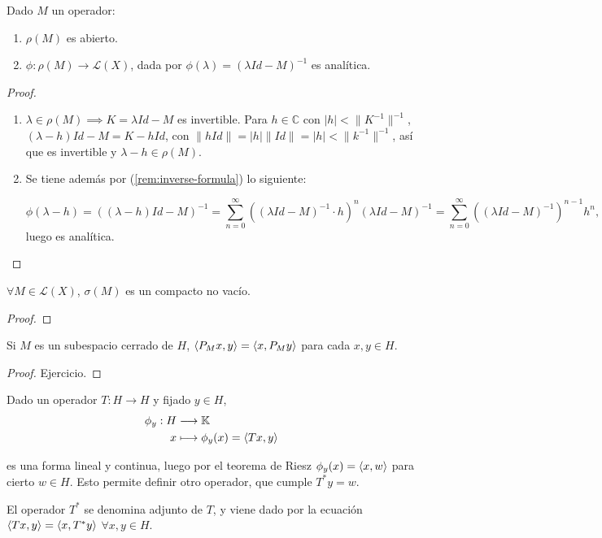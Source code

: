 \begin{theorem}
  Dado $M$ un operador:
  \begin{enumerate}
    \item $\rho(M)$ es abierto.
    \item $\phi:\rho(M)\to  \mathcal{L}(X)$, dada por $\phi(\lambda)=(\lambda
      Id-M)^{-1}$ es analítica.
  \end{enumerate}
\end{theorem}

\begin{proof}
  \begin{enumerate}
    \item $\lambda\in \rho(M)\implies K=\lambda Id-M$ es invertible. Para $h\in
      \mathbb{C}$ con $|h|<\|K^{-1}\|^{-1}$, $(\lambda-h)Id-M=K-hId$, con
      $\|hId\|=|h|\|Id\|=|h|<\|k^{-1}\|^{-1}$, así que es invertible y
      $\lambda-h\in \rho(M)$.
    \item Se tiene además por (\ref{rem:inverse-formula}) lo siguiente:

      \[
        \phi(\lambda-h)=((\lambda-h)Id-M)^{-1}=\sum_{n=0}^{\infty} ((\lambda Id-M)^{-1}\cdot
        h)^n(\lambda Id-M)^{-1}=\sum_{n=0}^{\infty} ((\lambda
        Id-M)^{-1})^{n-1}h^n
      ,\] 
      luego es analítica.
  \end{enumerate}
\end{proof}

\begin{theorem}[Gelfand]
  $\forall M\in \mathcal{L}(X)$, $\sigma(M)$ es un compacto no vacío.
\end{theorem}

\begin{proof}
  
\end{proof}

\begin{proposition}
  Si $M$ es un subespacio cerrado de  $H$, $\left\langle P_Mx,y\right\rangle=\left\langle x,P_My\right\rangle$ para
  cada $x,y\in H$.
\end{proposition}

\begin{proof}
  Ejercicio.
\end{proof}

\begin{remark}
  Dado un operador $T:H\to H$ y fijado $y\in H$,
  \begin{align*}
    \phi_y: H &\longrightarrow \mathbb{K} \\
    x &\longmapsto \phi_y(x) = \left\langle Tx,y\right\rangle
  \end{align*}

  es una forma lineal y continua, luego por el teorema de Riesz
  $\phi_y(x)=\left\langle x,w\right\rangle$ para cierto $w\in H$. Esto permite definir otro
  operador, que cumple $T^*y=w$.
\end{remark}

\begin{definition}
  El operador $T^*$ se denomina adjunto de $T$, y viene dado por la ecuación
  $\left\langle Tx,y\right\rangle=\left\langle x,T^*y\right\rangle$ $\forall x,y\in H$.
\end{definition}


